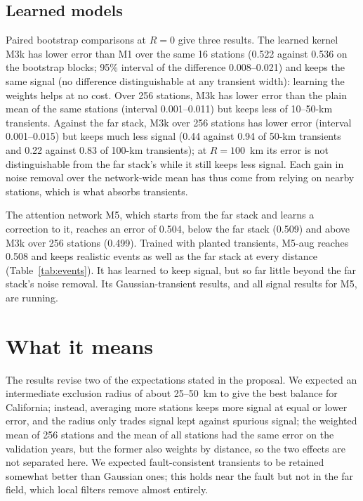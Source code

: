 \documentclass[11pt,a4paper]{article}
\begin{document}
\subsection{Learned models}

Paired bootstrap comparisons at $R = 0$ give three results. The learned kernel M3k has lower error than M1 over the same 16 stations (0.522 against 0.536 on the bootstrap blocks; 95\% interval of the difference 0.008--0.021) and keeps the same signal (no difference distinguishable at any transient width): learning the weights helps at no cost. Over 256 stations, M3k has lower error than the plain mean of the same stations (interval 0.001--0.011) but keeps less of 10--50-km transients. Against the far stack, M3k over 256 stations has lower error (interval 0.001--0.015) but keeps much less signal (0.44 against 0.94 of 50-km transients and 0.22 against 0.83 of 100-km transients); at $R = 100$~km its error is not distinguishable from the far stack's while it still keeps less signal. Each gain in noise removal over the network-wide mean has thus come from relying on nearby stations, which is what absorbs transients.

The attention network M5, which starts from the far stack and learns a correction to it, reaches an error of 0.504, below the far stack (0.509) and above M3k over 256 stations (0.499). Trained with planted transients, M5-aug reaches 0.508 and keeps realistic events as well as the far stack at every distance (Table~\ref{tab:events}). It has learned to keep signal, but so far little beyond the far stack's noise removal. Its Gaussian-transient results, and all signal results for M5, are running.

\section{What it means}

The results revise two of the expectations stated in the proposal. We expected an intermediate exclusion radius of about 25--50~km to give the best balance for California; instead, averaging more stations keeps more signal at equal or lower error, and the radius only trades signal kept against spurious signal; the weighted mean of 256 stations and the mean of all stations had the same error on the validation years, but the former also weights by distance, so the two effects are not separated here. We expected fault-consistent transients to be retained somewhat better than Gaussian ones; this holds near the fault but not in the far field, which local filters remove almost entirely.
\end{document}
